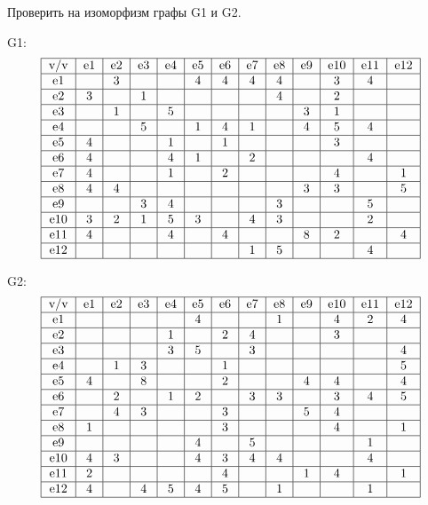 \documentclass{article}
\begin{document}
\itmo[
  variant=161,
  labn=5,
  worktype=Домашняя работа,
  discipline=Дискретная математика,
  group=P3115,
  student=Владимир Мацюк,
  teacher=Поляков Владимир Иванович,
  logo=../../lib/img/itmo.png
]

Проверить на изоморфизм графы G1 и G2.

G1:
$$\begin{tabular}{|c|c|c|c|c|c|c|c|c|c|c|c|c|c|c|c|c|c|c|c|c|c|c|c|} \hline

    v/v & e1 & e2 & e3 & e4 & e5 & e6 & e7 & e8 & e9 & e10 & e11 & e12 \nl
    e1  &    & 3  &    &    & 4  & 4  & 4  & 4  &    & 3   & 4   & \nl
    e2  & 3  &    & 1  &    &    &    &    & 4  &    & 2   &     & \nl
    e3  &    & 1  &    & 5  &    &    &    &    & 3  & 1   &     & \nl
    e4  &    &    & 5  &    & 1  & 4  & 1  &    & 4  & 5   & 4   & \nl
    e5  & 4  &    &    & 1  &    & 1  &    &    &    & 3   &     & \nl
    e6  & 4  &    &    & 4  & 1  &    & 2  &    &    &     & 4   & \nl
    e7  & 4  &    &    & 1  &    & 2  &    &    &    & 4   &     & 1 \nl
    e8  & 4  & 4  &    &    &    &    &    &    & 3  & 3   &     & 5 \nl
    e9  &    &    & 3  & 4  &    &    &    & 3  &    &     & 5   & \nl
    e10 & 3  & 2  & 1  & 5  & 3  &    & 4  & 3  &    &     & 2   & \nl
    e11 & 4  &    &    & 4  &    & 4  &    &    & 8  & 2   &     & 4 \nl
    e12 &    &    &    &    &    &    & 1  & 5  &    &     & 4   & \nl
  \end{tabular}$$

G2:
$$\begin{tabular}{|c|c|c|c|c|c|c|c|c|c|c|c|c|c|c|c|c|c|c|c|c|c|c|c|} \hline
    v/v & e1 & e2 & e3 & e4 & e5 & e6 & e7 & e8 & e9 & e10 & e11 & e12 \nl
    e1  &    &    &    &    & 4  &    &    & 1  &    & 4   & 2   & 4 \nl
    e2  &    &    &    & 1  &    & 2  & 4  &    &    & 3   &     & \nl
    e3  &    &    &    & 3  & 5  &    & 3  &    &    &     &     & 4 \nl
    e4  &    & 1  & 3  &    &    & 1  &    &    &    &     &     & 5 \nl
    e5  & 4  &    & 8  &    &    & 2  &    &    & 4  & 4   &     & 4 \nl
    e6  &    & 2  &    & 1  & 2  &    & 3  & 3  &    & 3   & 4   & 5 \nl
    e7  &    & 4  & 3  &    &    & 3  &    &    & 5  & 4   &     & \nl
    e8  & 1  &    &    &    &    & 3  &    &    &    & 4   &     & 1 \nl
    e9  &    &    &    &    & 4  &    & 5  &    &    &     & 1   & \nl
    e10 & 4  & 3  &    &    & 4  & 3  & 4  & 4  &    &     & 4   & \nl
    e11 & 2  &    &    &    &    & 4  &    &    & 1  & 4   &     & 1  \nl
    e12 & 4  &    & 4  & 5  & 4  & 5  &    & 1  &    &     & 1   & \nl
  \end{tabular}$$
\end{document}
